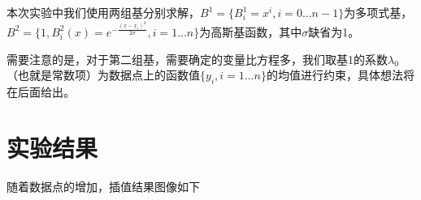 \documentclass[12pt]{article}
\begin{document}
本次实验中我们使用两组基分别求解，$B^1=\{B^1_i=x^i,i=0...n-1\}$为多项式基，$\displaystyle B^2=\{1,B^2_i(x)=e^{-\frac{(x-x_i)^2}{2\sigma}},i=1...n\}$为高斯基函数，其中$\sigma$缺省为1。

需要注意的是，对于第二组基，需要确定的变量比方程多，我们取基1的系数$\lambda_0$（也就是常数项）为数据点上的函数值$\{y_i,i=1...n\}$的均值进行约束，具体想法将在后面给出。

\section{实验结果}
随着数据点的增加，插值结果图像如下
\begin{figure}[H]
\end{figure}
\end{document}
